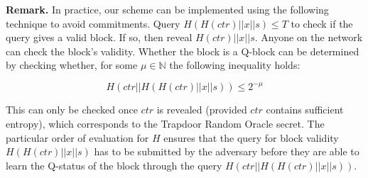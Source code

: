 \noindent
\textbf{Remark.}
In practice, our scheme can be implemented using the following technique to
avoid commitments. Query $H(H(ctr) || x || s) \leq T$ to check if the query gives
a valid block. If so, then reveal $H(ctr) || x || s$. Anyone on the network can
check the block's validity. Whether the block is a Q-block can be determined by
checking whether, for some $\mu \in \mathbb{N}$ the following inequality holds:

\[
  H(ctr || H(H(ctr) || x || s)) \leq 2^{-\mu}
\]

This can only be checked once $ctr$ is revealed (provided $ctr$ contains
sufficient entropy), which corresponds to the Trapdoor Random Oracle secret.
The particular order of evaluation for $H$ ensures that the query for block
validity $H(H(ctr) || x || s)$ has to be submitted by the adversary before they
are able to learn the Q-status of the block through the query
$H(ctr || H(H(ctr) || x || s))$.
